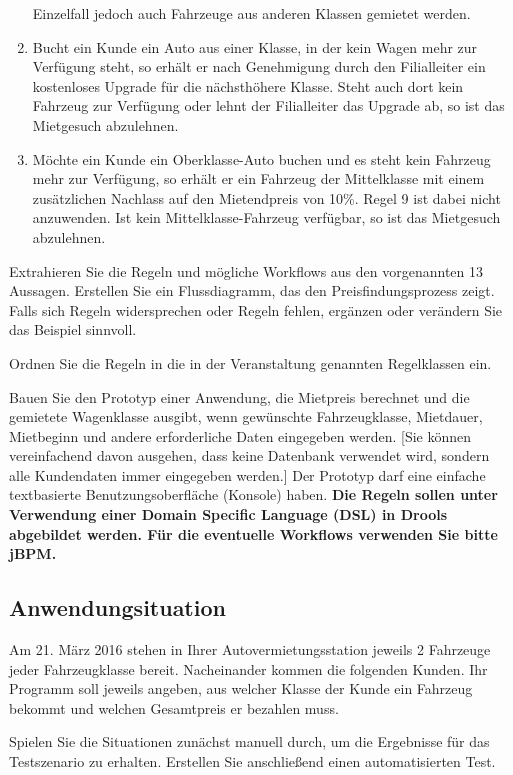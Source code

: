 \begin{enumerate}
	Einzelfall jedoch auch Fahrzeuge aus anderen Klassen gemietet werden.
	\item Bucht ein Kunde ein Auto aus einer Klasse, in der kein Wagen mehr zur Verfügung steht, so erhält
	er nach Genehmigung durch den Filialleiter ein kostenloses Upgrade für die nächsthöhere Klasse.
	Steht auch dort kein Fahrzeug zur Verfügung oder lehnt der Filialleiter das Upgrade ab, so ist das
	Mietgesuch abzulehnen.
	\item Möchte ein Kunde ein Oberklasse-Auto buchen und es steht kein Fahrzeug mehr zur Verfügung,
	so erhält er ein Fahrzeug der Mittelklasse mit einem zusätzlichen Nachlass auf den Mietendpreis
	von 10\%. Regel 9 ist dabei nicht anzuwenden. Ist kein Mittelklasse-Fahrzeug verfügbar, so ist das
	Mietgesuch abzulehnen.
\end{enumerate}

Extrahieren Sie die Regeln und mögliche Workflows aus den vorgenannten 13 Aussagen. Erstellen Sie
ein Flussdiagramm, das den Preisfindungsprozess zeigt. Falls sich Regeln widersprechen oder Regeln
fehlen, ergänzen oder verändern Sie das Beispiel sinnvoll.

Ordnen Sie die Regeln in die in der Veranstaltung genannten Regelklassen ein.


Bauen Sie den Prototyp einer Anwendung, die Mietpreis berechnet und die gemietete Wagenklasse
ausgibt, wenn gewünschte Fahrzeugklasse, Mietdauer, Mietbeginn und andere erforderliche Daten
eingegeben werden. [Sie können vereinfachend davon ausgehen, dass keine Datenbank verwendet
wird, sondern alle Kundendaten immer eingegeben werden.] Der Prototyp darf eine einfache
textbasierte Benutzungsoberfläche (Konsole) haben. \textbf{Die Regeln sollen unter Verwendung einer
Domain Specific Language (DSL) in Drools abgebildet werden. Für die eventuelle Workflows verwenden Sie bitte jBPM.}

\subsection*{Anwendungsituation}
Am 21. März 2016 stehen in Ihrer Autovermietungsstation jeweils 2 Fahrzeuge jeder Fahrzeugklasse
bereit. Nacheinander kommen die folgenden Kunden. Ihr Programm soll jeweils angeben, aus
welcher Klasse der Kunde ein Fahrzeug bekommt und welchen Gesamtpreis er bezahlen muss.

Spielen Sie die Situationen zunächst manuell durch, um die Ergebnisse für das Testszenario zu
erhalten. Erstellen Sie anschließend einen automatisierten Test.

